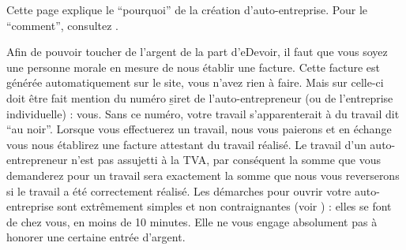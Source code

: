 ﻿Cette page explique le “pourquoi” de la création d'auto-entreprise. Pour le “comment”, consultez .

Afin de pouvoir toucher de l'argent de la part d'eDevoir, il faut que vous soyez une personne morale en mesure de nous établir une facture. Cette facture est générée automatiquement sur le site, vous n'avez rien à faire. Mais sur celle-ci doit être fait mention du numéro \b{siret} de l'auto-entrepreneur (ou de l'entreprise individuelle) : vous. Sans ce numéro, votre travail s'apparenterait à du travail dit “au noir”. Lorsque vous effectuerez un travail, nous vous paierons et en échange vous nous établirez une facture attestant du travail réalisé. Le travail d'un auto-entrepreneur n'est pas assujetti à la TVA, par conséquent la somme que vous demanderez pour un travail sera exactement la somme que nous vous reverserons si le travail a été correctement réalisé.
Les démarches pour ouvrir votre auto-entreprise sont extrêmement simples et non contraignantes (voir ) : elles se font de chez vous, en moins de 10 minutes. Elle ne vous engage absolument pas à honorer une certaine entrée d'argent.